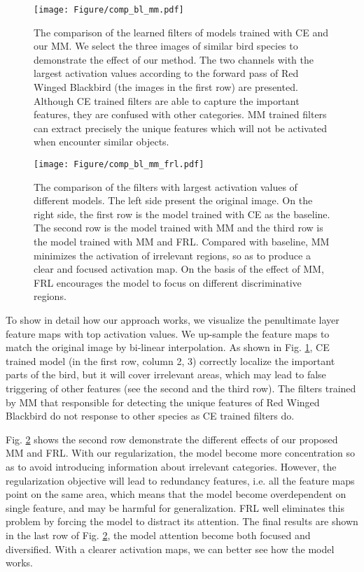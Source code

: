 \documentclass{article}
\theoremstyle{definition}
\begin{document}
\begin{figure}[t]
    \centering
    \texttt{[image: Figure/comp\_bl\_mm.pdf]}
    \caption{The comparison of the learned filters of models trained with CE and our MM. We select the three images of similar bird species to demonstrate the effect of our method. The two channels with the largest activation values according to the forward pass of Red Winged Blackbird (the images in the first row) are presented. Although CE trained filters are able to capture the important features, they are confused with other categories. MM trained filters can extract precisely the unique features which will not be activated when encounter similar objects.}
    \label{fig:cam_1}
\end{figure}

\begin{figure}[ht]
    \centering
    \texttt{[image: Figure/comp\_bl\_mm\_frl.pdf]}
    \caption{The comparison of the filters with largest activation values of different models. The left side present the original image. On the right side, the first row is the model trained with CE as the baseline. The second row is the model trained with MM and the third row is the model trained with MM and FRL. Compared with baseline, MM minimizes the activation of irrelevant regions, so as to produce a clear and focused activation map. On the basis of the effect of MM, FRL encourages the model to focus on different discriminative regions.}
    \label{fig:cam_2}
\end{figure}

To show in detail how our approach works, we visualize the penultimate layer feature maps with top activation values. We up-sample the feature maps to match the original image by bi-linear interpolation. As shown in Fig. \ref{fig:cam_1}, CE trained model (in the first row, column 2, 3) correctly localize the important parts of the bird, but it will cover irrelevant areas, which may lead to false triggering of other features (see the second and the third row). The filters trained by MM that responsible for detecting the unique features of Red Winged Blackbird do not response to other species as CE trained filters do. 

Fig. \ref{fig:cam_2} shows the second row demonstrate the different effects of our proposed MM and FRL. With our regularization, the model become more concentration so as to avoid introducing information about irrelevant categories. However, the regularization objective will lead to redundancy features, i.e. all the feature maps point on the same area, which means that the model become overdependent on single feature, and may be harmful for generalization. FRL well eliminates this problem by forcing the model to distract its attention. The final results are shown in the last row of Fig. \ref{fig:cam_2}, the model attention become both focused and diversified. With a clearer activation maps, we can better see how the model works.
\end{document}
